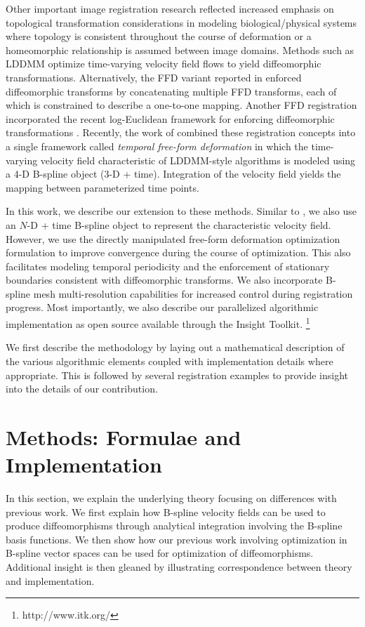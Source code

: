 \documentclass{llncs}
\begin{document}
Other important image registration research
reflected increased emphasis on topological transformation considerations
in modeling biological/physical systems where topology is 
consistent throughout the course of deformation or a 
homeomorphic relationship is assumed between image domains.
Methods such as LDDMM \cite{beg2005} optimize time-varying velocity field 
flows to yield diffeomorphic transformations.  Alternatively, the FFD 
variant reported in \cite{rueckert2006} enforced diffeomorphic transforms
by concatenating multiple FFD transforms, each of which is constrained
to describe a one-to-one mapping.  Another FFD registration
incorporated the recent log-Euclidean framework for enforcing diffeomorphic
transformations \cite{Modat2011}.
Recently, the work of 
\cite{de-craene2011} combined these registration concepts into a single
framework called {\em temporal free-form deformation} in which the 
time-varying velocity field characteristic of LDDMM-style algorithms
is modeled using a 4-D B-spline object (3-D + time).  Integration of 
the velocity field yields the mapping between parameterized time points.

In this work, we describe our extension to these methods.  Similar to 
\cite{de-craene2011}, we also use an $N$-D + time B-spline object to 
represent the characteristic velocity field.  However, we use the 
directly manipulated free-form deformation optimization formulation to improve 
convergence during the course of optimization.  This also facilitates
modeling temporal periodicity and
the enforcement of stationary boundaries consistent with diffeomorphic
transforms.
We also incorporate B-spline mesh multi-resolution capabilities
for increased control during registration progress.  
Most importantly, we also describe
our parallelized algorithmic implementation as open source available through the Insight Toolkit.%
\footnote{
http://www.itk.org/
}

We first describe the methodology by laying out a mathematical description 
of the various algorithmic elements coupled with implementation details
where appropriate.  This is followed by several registration examples
to provide insight into the details of our contribution. 

\section{Methods: Formulae  and Implementation}

In this section, we explain the underlying theory focusing on
differences with previous work.  We first explain how B-spline
velocity fields can be used to produce diffeomorphisms through
analytical integration involving the B-spline basis functions. 
We then show how our previous work involving optimization in 
B-spline vector spaces \cite{tustison2009} can be used for
optimization of diffeomorphisms.  Additional insight is then
gleaned by illustrating correspondence between theory and 
implementation.
\end{document}
